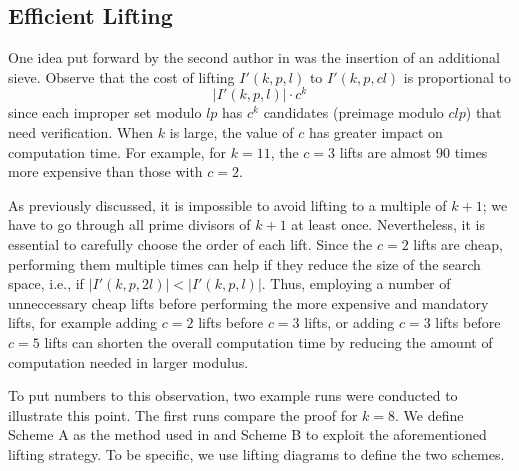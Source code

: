 \documentclass[11pt]{amsart}
\theoremstyle{definition}
\theoremstyle{remark}
\begin{document}
\subsection{Efficient Lifting}
One idea put forward by the second author in \cite{Trakulthongchai} was the insertion of an additional sieve.
Observe that the cost of lifting $I'(k,p,l)$ to $I'(k,p,cl)$ is proportional to \[ |I'(k,p,l)| \cdot c^k\] 
since each improper set modulo $lp$ has $c^k$ candidates (preimage modulo $clp$) that need verification.
When $k$ is large, the value of $c$ has greater impact on computation time. For example, for $k=11$, 
the $c=3$ lifts are almost 90 times more expensive than those with $c=2$.

As previously discussed, it is impossible to avoid lifting to a multiple of $k+1$; 
we have to go through all prime divisors of $k+1$ at least once.
Nevertheless, it is essential to carefully choose the order of each lift.
Since the $c=2$ lifts are cheap, performing them multiple times can help if they reduce the size of the search space,
i.e., if $|I'(k, p, 2l)| < |I'(k,p,l)|$.
Thus, employing a number of unneccessary cheap lifts before performing the more expensive and mandatory lifts, for example 
adding $c=2$ lifts before $c=3$ lifts, or adding $c=3$ lifts before $c=5$ lifts can shorten the overall computation time 
by reducing the amount of computation needed in larger modulus.

To put numbers to this observation, two example runs were conducted to illustrate this point. 
The first runs compare the proof for $k=8$. We define Scheme A as the method used in \cite{Trakulthongchai} and 
Scheme B to exploit the aforementioned lifting strategy.
To be specific, we use lifting diagrams to define the two schemes.
\end{document}
